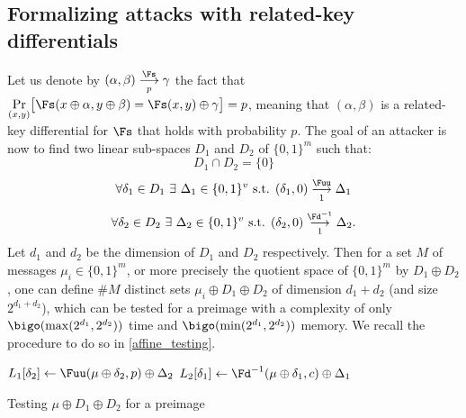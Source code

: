 \subsection{Formalizing \mitm attacks with related-key differentials}

Let us denote by $(\alpha,  \beta) \overset{\Fs}{\underset{p}{\longrightarrow}} \gamma$ the fact that 
$\underset{(x,y)}{\Pr}\big[\Fs(x \oplus \alpha, y \oplus \beta) = \Fs(x, y) \oplus \gamma\big] = p$, meaning
that $(\alpha, \beta)$ is a related-key differential for $\Fs$ that holds with probability $p$.
The goal of an attacker is now to find two linear sub-spaces $D_1$ and $D_2$ of $\{0,1\}^m$ such that:
\begin{equation}
D_1 \cap D_2 = \{0\}
\end{equation}
\vspace{-4mm}
\begin{equation}
\forall \delta_1 \in D_1~\exists~ \Delta_1 \in \{0,1\}^v \text{ s.t. } (\delta_1, 0) \overset{\Fuu}{\underset{1}{\longrightarrow}} \Delta_1
\label{diff1}
\end{equation}
\vspace{-4mm}
\begin{equation}
\forall \delta_2 \in D_2~ \exists~ \Delta_2 \in \{0,1\}^v \text{ s.t. } (\delta_2, 0) \overset{\Fd^{-1}}{\underset{1}{\longrightarrow}} \Delta_2.
\label{diff2}
\end{equation}
Let $d_1$ and $d_2$ be the dimension of $D_1$ and $D_2$ respectively. Then for a set $M$ of messages $\mu_i \in \{0,1\}^m$, or more
precisely the quotient space of $\{0,1\}^m$ by $D_1 \oplus D_2$,
one can define $\#M$ distinct sets $\mu_i \oplus D_1 \oplus D_2$ of dimension $d_1 + d_2$ (and size $2^{d_1 + d_2}$),
which can be tested for a preimage with a complexity of only $\bigo(\max(2^{d_1}, 2^{d_2}))$ time and $\bigo(\min(2^{d_1}, 2^{d_2}))$ memory.
We recall the procedure to do so in \autoref{affine_testing}.
 
\begin{algorithm}[ht]
\LinesNumbered
{}

{
	$L_1[\delta_2] \leftarrow \Fuu(\mu \oplus \delta_2, p) \oplus \Delta_2$
}
{
	$L_2[\delta_1] \leftarrow \Fd^{-1}(\mu \oplus \delta_1, c) \oplus \Delta_1$
}
{
{
}
}
\Return{$\bot$}
\caption{\label{affine_testing}Testing $\mu \oplus D_1 \oplus D_2$ for a preimage~\cite{DBLP:conf/crypto/KnellwolfK12}}

\end{algorithm}

